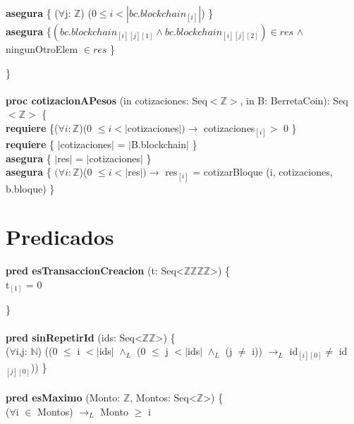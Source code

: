\documentclass{article}
\newcommand{\Entero}{$\mathds{Z}$}
\newcommand{\Natural}{$\mathds{N}$}
\newcommand{\tuplaDeDosEnteros}{Seq\textless\Entero\texttimes\Entero\textgreater}
\newcommand{\tuplaDeCuatroEnteros}{Seq\textless\Entero\texttimes\Entero\texttimes\Entero\texttimes\Entero\textgreater}
\begin{document}
        \indent\indent \textbf{asegura} \{ ($\forall$j: \Entero) ($0 \le i < |bc.blockchain_{[i]}|$) \}\\

        \indent\indent \textbf{asegura} \{$ (bc.blockchain_{[i][j][1]} \land bc.blockchain_{[i][j][2]}) \in res$
                                            $\land$ ningunOtroElem $\in res$ \}
    
    \}\\\\

    \textbf{proc cotizacionAPesos} (in cotizaciones: Seq$<$\Entero$>$, in B: BerretaCoin): Seq$<$\Entero$>$ \{\\
        \indent\indent \textbf{requiere} \{($\forall i:$\Entero)(0 $\le i <|$cotizaciones$|) \rightarrow$ cotizaciones$_{[i]} >$ 0 \}\\

        \indent\indent \textbf{requiere} \{ $|$cotizaciones$|$ = $|$B.blockchain$|$ \}\\

        \indent\indent \textbf{asegura} \{ $|$res$|$ = $|$cotizaciones$|$ \}\\

        \indent\indent \textbf{asegura} \{ $(\forall i: $\Entero)(0 $\le i < |$res$|)\rightarrow$ res$_{[i]}$ = cotizarBloque (i, cotizaciones, b.bloque) \}




\newpage
\section*{Predicados}

    \textbf{pred esTransaccionCreacion} (t: \tuplaDeCuatroEnteros) \{\\
        \indent\indent t$_{[1]}$ = 0

    \}\\\\

    \textbf{pred sinRepetirId} (ids: \tuplaDeDosEnteros) \{\\
        \indent\indent($\forall$i,j: \Natural) ((0 $\leq$ i $<|$ids$|$ $\land_L$ (0 $\leq$ j $<|$ids$|$ $\land_L$ (j $\neq$ i))
                        $\rightarrow_L$ id$_{[i][0]} \neq$ id$_{[j][0]}$)) \}\\\\

    \textbf{pred esMaximo} (Monto: \Entero, Montos: Seq\textless$\mathds{Z}$\textgreater) \{\\
        \indent\indent($\forall$i $\in$ Montos) $\rightarrow_L$ Monto $\geq$ i
\end{document}
